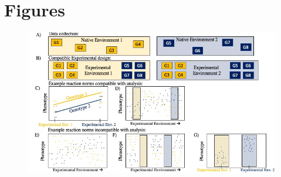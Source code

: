 \documentclass[11pt, oneside]{amsart}
\begin{document}
\clearpage
\newpage


\renewcommand\thesection{Supplemental Figures}


\section{Figures}

\renewcommand{\figurename}{Supplementary Figure}

\renewcommand\thefigure{S1}
\begin{figure}[h]
\begin{center}
\includegraphics[width=6in]{Figs/IncompatibleDesigns.jpg}
\end{center}
\label{Fig: Compatible and Incompatible designs}

\end{figure}
\end{document}
